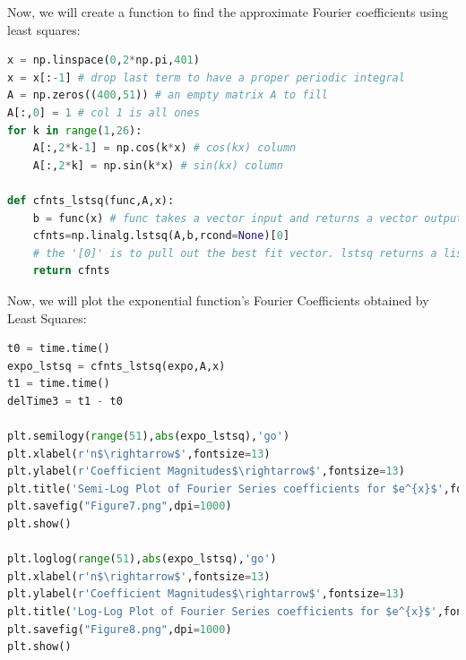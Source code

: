 \documentclass[12pt]{article}
\begin{document}
Now, we will create a function to find the approximate Fourier coefficients using least squares:

\begin{lstlisting}[language=Python]
x = np.linspace(0,2*np.pi,401)
x = x[:-1] # drop last term to have a proper periodic integral
A = np.zeros((400,51)) # an empty matrix A to fill
A[:,0] = 1 # col 1 is all ones
for k in range(1,26):
    A[:,2*k-1] = np.cos(k*x) # cos(kx) column
    A[:,2*k] = np.sin(k*x) # sin(kx) column

def cfnts_lstsq(func,A,x):
    b = func(x) # func takes a vector input and returns a vector output
    cfnts=np.linalg.lstsq(A,b,rcond=None)[0]
    # the '[0]' is to pull out the best fit vector. lstsq returns a list.
    return cfnts
\end{lstlisting}
\pagebreak

Now, we will plot the exponential function's Fourier Coefficients obtained by Least Squares:

\begin{lstlisting}[language=Python]
t0 = time.time()
expo_lstsq = cfnts_lstsq(expo,A,x)
t1 = time.time()
delTime3 = t1 - t0

plt.semilogy(range(51),abs(expo_lstsq),'go')
plt.xlabel(r'n$\rightarrow$',fontsize=13)
plt.ylabel(r'Coefficient Magnitudes$\rightarrow$',fontsize=13)
plt.title('Semi-Log Plot of Fourier Series coefficients for $e^{x}$',fontsize=16)
plt.savefig("Figure7.png",dpi=1000)
plt.show()

plt.loglog(range(51),abs(expo_lstsq),'go')
plt.xlabel(r'n$\rightarrow$',fontsize=13)
plt.ylabel(r'Coefficient Magnitudes$\rightarrow$',fontsize=13)
plt.title('Log-Log Plot of Fourier Series coefficients for $e^{x}$',fontsize=16)
plt.savefig("Figure8.png",dpi=1000)
plt.show()
\end{lstlisting}
\end{document}
